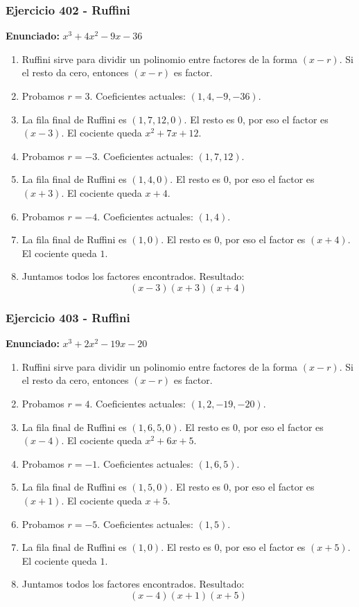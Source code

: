 \documentclass[11pt,a4paper]{article}
\begin{document}
\vspace{0.2cm}
\subsubsection*{Ejercicio 402 - Ruffini}
\textbf{Enunciado:} $ x^{3} + 4 x^{2} - 9 x - 36 $\par
\begin{enumerate}[leftmargin=2em]
\item Ruffini sirve para dividir un polinomio entre factores de la forma \((x-r)\). Si el resto da cero, entonces \((x-r)\) es factor.
\item Probamos \(r=3\). Coeficientes actuales: \((1, 4, -9, -36)\).
\item La fila final de Ruffini es \((1, 7, 12, 0)\). El resto es \(0\), por eso el factor es \((x-3)\). El cociente queda \(x^{2} + 7 x + 12\).
\item Probamos \(r=-3\). Coeficientes actuales: \((1, 7, 12)\).
\item La fila final de Ruffini es \((1, 4, 0)\). El resto es \(0\), por eso el factor es \((x+3)\). El cociente queda \(x + 4\).
\item Probamos \(r=-4\). Coeficientes actuales: \((1, 4)\).
\item La fila final de Ruffini es \((1, 0)\). El resto es \(0\), por eso el factor es \((x+4)\). El cociente queda \(1\).
\item Juntamos todos los factores encontrados. Resultado: \[\boxed{\left(x - 3\right) \left(x + 3\right) \left(x + 4\right)}\]
\end{enumerate}

\vspace{0.2cm}
\subsubsection*{Ejercicio 403 - Ruffini}
\textbf{Enunciado:} $ x^{3} + 2 x^{2} - 19 x - 20 $\par
\begin{enumerate}[leftmargin=2em]
\item Ruffini sirve para dividir un polinomio entre factores de la forma \((x-r)\). Si el resto da cero, entonces \((x-r)\) es factor.
\item Probamos \(r=4\). Coeficientes actuales: \((1, 2, -19, -20)\).
\item La fila final de Ruffini es \((1, 6, 5, 0)\). El resto es \(0\), por eso el factor es \((x-4)\). El cociente queda \(x^{2} + 6 x + 5\).
\item Probamos \(r=-1\). Coeficientes actuales: \((1, 6, 5)\).
\item La fila final de Ruffini es \((1, 5, 0)\). El resto es \(0\), por eso el factor es \((x+1)\). El cociente queda \(x + 5\).
\item Probamos \(r=-5\). Coeficientes actuales: \((1, 5)\).
\item La fila final de Ruffini es \((1, 0)\). El resto es \(0\), por eso el factor es \((x+5)\). El cociente queda \(1\).
\item Juntamos todos los factores encontrados. Resultado: \[\boxed{\left(x - 4\right) \left(x + 1\right) \left(x + 5\right)}\]
\end{enumerate}
\end{document}
